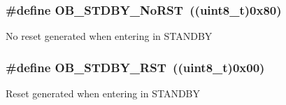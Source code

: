 \subsubsection[{O\+B\+\_\+\+S\+T\+D\+B\+Y\+\_\+\+No\+R\+S\+T}]{\setlength{\rightskip}{0pt plus 5cm}\#define O\+B\+\_\+\+S\+T\+D\+B\+Y\+\_\+\+No\+R\+S\+T~((uint8\+\_\+t)0x80)}\label{group___f_l_a_s_h___option___bytes__n_r_s_t___s_t_d_b_y_ga9588443b20719498422aeb72b65de839}
No reset generated when entering in S\+T\+A\+N\+D\+B\+Y \hypertarget{group___f_l_a_s_h___option___bytes__n_r_s_t___s_t_d_b_y_ga69451a6f69247528f58735c9c83499ce}{}
\subsubsection[{O\+B\+\_\+\+S\+T\+D\+B\+Y\+\_\+\+R\+S\+T}]{\setlength{\rightskip}{0pt plus 5cm}\#define O\+B\+\_\+\+S\+T\+D\+B\+Y\+\_\+\+R\+S\+T~((uint8\+\_\+t)0x00)}\label{group___f_l_a_s_h___option___bytes__n_r_s_t___s_t_d_b_y_ga69451a6f69247528f58735c9c83499ce}
Reset generated when entering in S\+T\+A\+N\+D\+B\+Y 